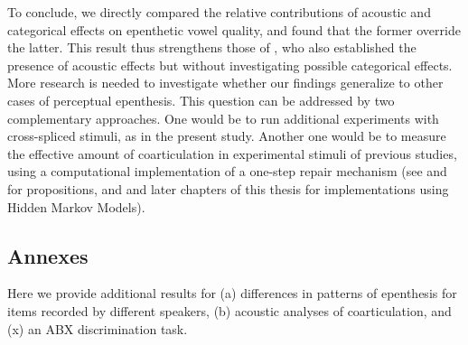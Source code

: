 To conclude, we directly compared the relative contributions of acoustic and categorical effects on epenthetic vowel quality, and found that the former override the latter. This result thus strengthens those of \cite{dupoux2011}, who also established the presence of acoustic effects but without investigating possible categorical effects. More research is needed to investigate whether our findings generalize to other cases of perceptual epenthesis. This question can be addressed by two complementary approaches. One would be to run additional experiments with cross-spliced stimuli, as in the present study. Another one would be to measure the effective amount of coarticulation in experimental stimuli of previous studies, using a computational implementation of a one-step repair mechanism (see \cite{dupoux2011} and \cite{wilson2014} for propositions, and \cite{schatz2016} and later chapters of this thesis for implementations using Hidden Markov Models).

\subsection{Annexes}

Here we provide additional results for (a) differences in patterns of epenthesis for items recorded by different speakers, (b) acoustic analyses of coarticulation, and (x) an ABX discrimination task.    

